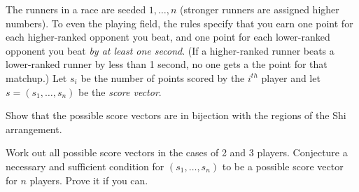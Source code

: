 \prob The runners in a
race are seeded $1,\dots,n$ (stronger runners are assigned
higher numbers).  To even the playing field, the rules specify
that you earn one point for each higher-ranked opponent you beat, and
one point for each lower-ranked opponent you beat \emph{by at least
one second}.  (If a higher-ranked runner beats a lower-ranked
runner by less than 1 second, no one gets a the point for that
matchup.)  Let $s_i$ be the number of points scored by the $i^{th}$
player and let $s=(s_1,\dots,s_n)$ be the \emph{score vector}.

\probpart Show that the possible score vectors are in
bijection with the regions of the Shi arrangement.

\probpart Work out all possible score vectors in the cases of 2 and 3 players.
Conjecture a necessary and sufficient condition for $(s_1,\dots,s_n)$
to be a possible score vector for $n$ players.  Prove it if you can.

